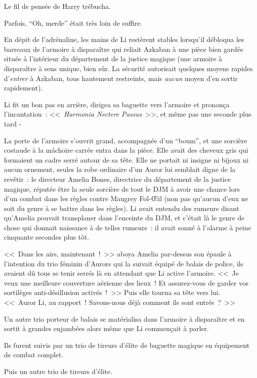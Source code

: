 Le fil de pensée de Harry trébucha.

Parfois, “Oh, merde” était très loin de suffire.

\later

En dépit de l'adrénaline, les mains de Li restèrent stables lorsqu'il débloqua les barreaux de l'armoire à disparaître qui reliait Azkaban à une pièce bien gardée située à l'intérieur du département de la justice magique (une armoire à disparaître à sens unique, bien sûr. La sécurité autorisait quelques moyens rapides d'\emph{entrer} à Azkaban, tous hautement restreints, mais \emph{aucun} moyen d'en sortir rapidement).

Li fit un bon pas en arrière, dirigea sa baguette vers l'armoire et prononça l'incantation~: <<~\emph{Harmonia Nectere Passus}~>>, et même pas une seconde plus tard -

La porte de l'armoire s'ouvrit grand, accompagnée d'un “boum”, et une sorcière costaude à la mâchoire carrée entra dans la pièce. Elle avait des cheveux gris qui formaient un cadre serré autour de sa tête. Elle ne portait ni insigne ni bijoux ni aucun ornement, seules la robe ordinaire d'un Auror lui semblait digne de la revêtir~: le directeur Amelia Bones, directrice du département de la justice magique, réputée être la seule sorcière de tout le DJM à avoir une chance lors d'un combat dans les règles contre Maugrey Fol-Œil (non pas qu'aucun d'eux ne soit du genre à se battre dans les règles). Li avait entendu des rumeurs disant qu'Amelia pouvait transplaner dans l'enceinte du DJM, et c'était là le genre de chose qui donnait naissance à de telles rumeurs~: il avait sonné à l'alarme à peine cinquante secondes plus tôt.

<<~Dans les airs, maintenant~!~>> aboya Amelia par-dessus son épaule à l'intention du trio féminin d'Aurors qui la suivait équipé de balais de police, ils avaient dû tous se tenir serrés là en attendant que Li active l'armoire. <<~Je veux une meilleure couverture aérienne des lieux~! Et assurez-vous de garder vos sortilèges anti-désillusion activés~!~>> Puis elle tourna sa tête vers lui. <<~Auror Li, au rapport~! Savons-nous déjà comment ils sont entrés~?~>>

Un autre trio porteur de balais se matérialisa dans l'armoire à disparaître et en sortit à grandes enjambées alors même que Li commençait à parler.

Ils furent suivis par un trio de tireurs d'élite de baguette magique en équipement de combat complet.

Puis un autre trio de tireurs d'élite.

